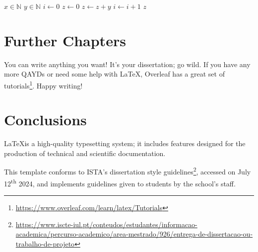 \documentclass{dissertation}
\begin{document}
\begin{algorithm}
    \caption{Algorithm for Multiplying Two Integers}
    \begin{algorithmic}
        \Require $x\in\mathbb{N}$
        \Require $y\in\mathbb{N}$
        \State $i \gets 0$
        \State $z \gets 0$
            \State $z \gets z + y$
            \State $i \gets i + 1$
        \EndWhile
        \State \Return $z$
    \end{algorithmic}
    \label{alg:example}
\end{algorithm}










\chapter{Further Chapters}

You can write anything you want! It's your dissertation; go wild. If you have any more \acp{QAYD} or need some help with \LaTeX, Overleaf has a great set of tutorials\footnote{\url{https://www.overleaf.com/learn/latex/Tutorials}}. Happy writing!










\chapter{Conclusions}

\LaTeX\space is a high-quality typesetting system; it includes features designed for the production of technical and scientific documentation.

This template conforms to ISTA's dissertation style guidelines\footnote{\url{https://www.iscte-iul.pt/conteudos/estudantes/informacao-academica/percurso-academico/area-mestrado/926/entrega-de-dissertacao-ou-trabalho-de-projeto}}, accessed on July 12\textsuperscript{th} 2024, and implements guidelines given to students by the school's staff.
\end{document}

